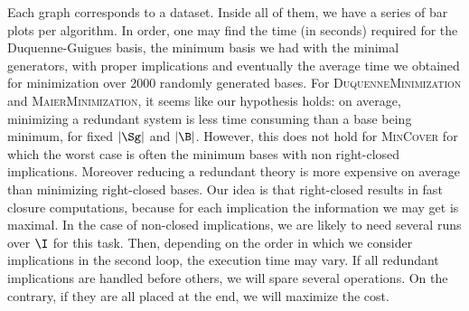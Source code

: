 \vspace{1.2em}

Each graph corresponds to a dataset. Inside all of them, we have a series
of bar plots per algorithm. In order, one may find the time (in seconds) required for the Duquenne-Guigues basis, the minimum basis we had with the
minimal generators, with proper implications and eventually the average
time we obtained for minimization over 2000 randomly generated bases. For \textsc{DuquenneMinimization} and \textsc{MaierMinimization}, it seems like
our hypothesis holds: on average, minimizing a redundant system is less time consuming than a base being minimum, for fixed $|\Sg|$ and $|\B|$. However,
this does not hold for \textsc{MinCover} for which the worst case is often
the minimum bases with non right-closed implications. Moreover reducing a redundant theory is more expensive on average than minimizing right-closed
bases. Our idea is that right-closed results in fast closure computations, because for each implication the information we may get is maximal. In the
case of non-closed implications, we are likely to need several runs over
$\I$ for this task. Then, depending on the order in which we consider implications in the second loop, the execution time may vary. If all redundant
implications are handled before others, we will spare several operations.
On the contrary, if they are all placed at the end, we will maximize the
cost.

\begin{figure}[H]
	
\end{figure}

\vspace{1.2em}

